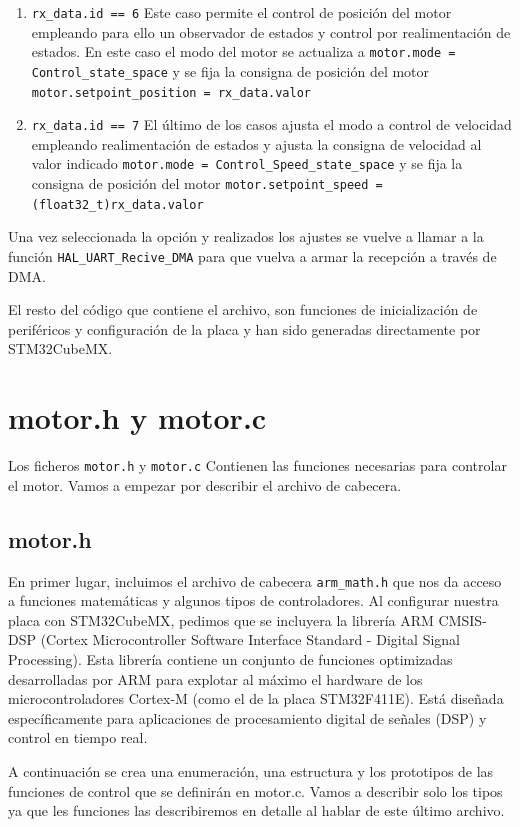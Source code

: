 \begin{enumerate}
    \item \texttt{rx\_data.id == 6} Este caso permite el control de posición del motor empleando para ello un observador de estados y control por realimentación de estados. En este caso el modo del motor se actualiza a \texttt{motor.mode = Control\_state\_space} y se fija la consigna de posición del motor \texttt{motor.setpoint\_position = rx\_data.valor}
    \item \texttt{rx\_data.id == 7} El último de los casos ajusta el modo a control de velocidad empleando realimentación de estados y ajusta la consigna de velocidad al valor indicado \texttt{motor.mode = Control\_Speed\_state\_space} y se fija la consigna de posición del motor \texttt{motor.setpoint\_speed = (float32\_t)rx\_data.valor}
\end{enumerate}
Una vez seleccionada la opción y realizados los ajustes se vuelve a llamar a la función \texttt{HAL\_UART\_Recive\_DMA} para que vuelva a armar la recepción a través de DMA.

El resto del código que contiene el archivo, son funciones de inicialización de periféricos y configuración de la placa y han sido generadas directamente por STM32CubeMX.

\section{motor.h y motor.c}\label{motorc}
Los ficheros \texttt{motor.h} y \texttt{motor.c} Contienen las funciones necesarias para controlar el motor. Vamos a empezar por describir el archivo de cabecera.
\subsection{motor.h}

En primer lugar, incluimos el archivo de cabecera \texttt{arm\_math.h} que nos da acceso a funciones matemáticas y algunos tipos de controladores. Al configurar nuestra placa con STM32CubeMX, pedimos que se incluyera  la librería ARM CMSIS-DSP (Cortex Microcontroller Software Interface Standard - Digital Signal Processing). Esta librería contiene un conjunto de funciones optimizadas desarrolladas por ARM para explotar al máximo el hardware de los microcontroladores Cortex-M (como el de la placa STM32F411E). Está diseñada específicamente para aplicaciones de procesamiento digital de señales (DSP) y control en tiempo real.

A continuación se crea una enumeración, una estructura y los prototipos de las funciones de control que se definirán en motor.c. Vamos a describir solo los tipos ya que les funciones las describiremos en detalle al hablar de este último archivo.

